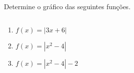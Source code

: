 \begin{frame}
  \begin{example}
    Determine o gráfico das seguintes funções.
  \end{example}
  \begin{columns}[onlytextwidth]
    \begin{column}{0.49\textwidth}
      \begin{enumerate}
        \item< only@1-2 > $f(x) = |3x + 6|$
        \item< only@3-4 > $f(x) = |x^{2} - 4|$
        \item< only@5-6 > $f(x) = |x^{2} - 4| - 2$
      \end{enumerate}
    \end{column}
    \begin{column}{0.49\textwidth}
      \begin{figure}\vspace*{-0.8cm}
      \end{figure}
    \end{column}
  \end{columns}
\end{frame}

